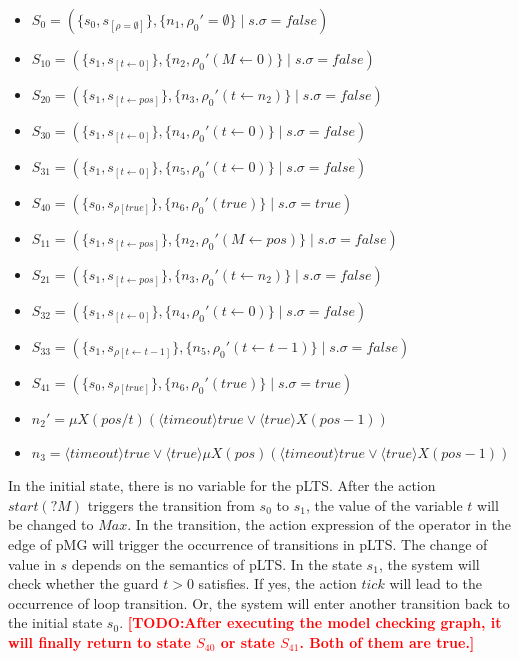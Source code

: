 \documentclass[runningheads,a4paper]{llncs}
\newcommand{\TODO}[1]{\textcolor{red}{\textbf{[TODO:#1]}}}
\begin{document}
\begin{itemize}
	\item $S_{0}  = (\{s_{0},s_{[\rho=\emptyset]}\}, \{n_{1}, \rho_{0}'=\emptyset\}\;|\;s.\sigma = false)$
	\item $S_{10} = (\{s_{1},s_{[t\leftarrow 0]}\}, \{n_{2}, \rho_{0}'(M\leftarrow 0)\}\;|\;s.\sigma = false)$
	\item $S_{20} = (\{s_{1},s_{[t\leftarrow pos]}\}, \{n_{3}, \rho_{0}'(t\leftarrow n_{2})\}\;|\;s.\sigma = false)$
	\item $S_{30} = (\{s_{1},s_{[t\leftarrow 0]}\}, \{n_{4}, \rho_{0}'(t\leftarrow 0)\}\;|\;s.\sigma = false)$
	\item $S_{31} = (\{s_{1},s_{[t\leftarrow 0]}\}, \{n_{5}, \rho_{0}'(t\leftarrow 0)\}\;|\;s.\sigma = false)$
	\item $S_{40} = (\{s_{0},s_{\rho[true]}\}, \{n_{6}, \rho_{0}'(true)\}\;|\;s.\sigma = true)$
	
	\item $S_{11} = (\{s_{1},s_{[t\leftarrow pos]}\}, \{n_{2}, \rho_{0}'(M\leftarrow pos)\}\;|\;s.\sigma = false)$
	\item $S_{21} = (\{s_{1},s_{[t\leftarrow pos]}\}, \{n_{3}, \rho_{0}'(t\leftarrow n_{2})\}\;|\;s.\sigma = false)$
	\item $S_{32} = (\{s_{1},s_{[t\leftarrow 0]}\}, \{n_{4}, \rho_{0}'(t\leftarrow 0)\}\;|\;s.\sigma = false)$
	\item $S_{33} = (\{s_{1},s_{\rho[t\leftarrow t-1]}\}, \{n_{5}, \rho_{0}'(t\leftarrow t-1)\}\;|\;s.\sigma = false)$
	\item $S_{41} = (\{s_{0},s_{\rho[true]}\}, \{n_{6}, \rho_{0}'(true)\}\;|\;s.\sigma = true)$
	\item $n_{2}'=\mu X(pos/t)(\langle timeout\rangle true \vee \langle true\rangle X(pos-1))$
	\item $n_{3}=\langle timeout\rangle true \vee\langle true\rangle\mu X(pos)(\langle timeout\rangle true \vee \langle true\rangle X(pos-1))$
\end{itemize}

In the initial state, there is no variable for the pLTS. After the action $start(?M)$ triggers the transition from $s_{0}$ to $s_{1}$, the value of the variable $t$ will be changed to $Max$. In the transition, the action expression of the operator in the edge of pMG will trigger the occurrence of transitions in pLTS. The change of value in $s$ depends on the semantics of pLTS. In the state $s_{1}$, the system will check whether the guard $t>0$ satisfies. If yes, the action $tick$ will lead to the occurrence of loop transition. Or, the system will enter another transition back to the initial state $s_{0}$. \TODO{After executing the model checking graph, it will finally return to state $S_{40}$ or state $S_{41}$. Both of them are true.}
\end{document}
